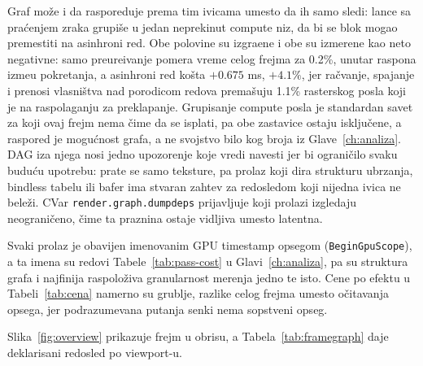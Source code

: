 Graf mo\v{z}e i da rasporeduje prema tim ivicama umesto da ih samo sledi: lance sa pra\'cenjem zraka grupi\v{s}e u jedan neprekinut compute niz, da bi se blok mogao premestiti na asinhroni red. Obe polovine su izgra\dj{}ene i obe su izmerene kao neto negativne: samo preure\dj{}ivanje pomera vreme celog frejma za 0.2\%, unutar raspona izme\dj{}u pokretanja, a asinhroni red ko\v{s}ta $+0.675$ ms, $+4.1\%$, jer ra\v{c}vanje, spajanje i prenosi vlasni\v{s}tva nad porodicom redova prema\v{s}uju 1.1\% rasterskog posla koji je na raspolaganju za preklapanje. Grupisanje compute posla je standardan savet za koji ovaj frejm nema \v{c}ime da se isplati, pa obe zastavice ostaju isklju\v{c}ene, a raspored je mogu\'cnost grafa, a ne svojstvo bilo kog broja iz Glave~\ref{ch:analiza}. DAG iza njega nosi jedno upozorenje koje vredi navesti jer bi ograni\v{c}ilo svaku budu\'cu upotrebu: prate se samo teksture, pa prolaz koji dira strukturu ubrzanja, bindless tabelu ili bafer ima stvaran zahtev za redosledom koji nijedna ivica ne bele\v{z}i. CVar \texttt{render.graph.dumpdeps} prijavljuje koji prolazi izgledaju neograni\v{c}eno, \v{c}ime ta praznina ostaje vidljiva umesto latentna.

Svaki prolaz je obavijen imenovanim GPU timestamp opsegom (\texttt{BeginGpuScope}), a ta imena su redovi Tabele~\ref{tab:pass-cost} u Glavi~\ref{ch:analiza}, pa su struktura grafa i najfinija raspolo\v{z}iva granularnost merenja jedno te isto. Cene po efektu u Tabeli~\ref{tab:cena} namerno su grublje, razlike celog frejma umesto o\v{c}itavanja opsega, jer podrazumevana putanja senki nema sopstveni opseg.

Slika~\ref{fig:overview} prikazuje frejm u obrisu, a Tabela~\ref{tab:framegraph} daje deklarisani redosled po viewport-u.

